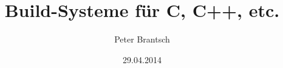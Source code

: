 \title[Build-Systeme]{Build-Systeme für C, C++, etc.}
\author{Peter Brantsch}
\date{29.04.2014}
\frame{\titlepage}
